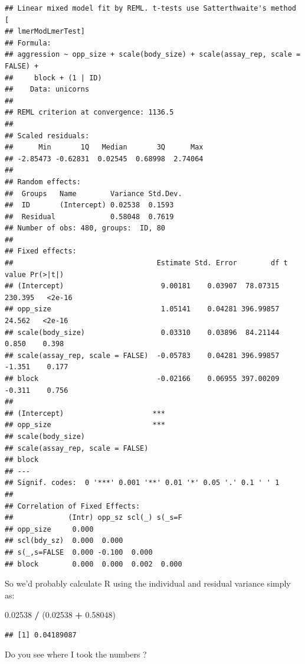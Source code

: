 \documentclass[
  12pt,
]{book}
\makeatletter
\newenvironment{Shaded}{\begin{snugshade}}{\end{snugshade}}
\newcommand{\FloatTok}[1]{\textcolor[rgb]{0.00,0.00,0.81}{#1}}
\newcommand{\NormalTok}[1]{#1}
\newcommand{\OperatorTok}[1]{\textcolor[rgb]{0.81,0.36,0.00}{\textbf{#1}}}
\newcommand{\StringTok}[1]{\textcolor[rgb]{0.31,0.60,0.02}{#1}}
\newenvironment{kframe}{%
\medskip{}
\setlength{\fboxsep}{.8em}
\def\at@end@of@kframe{}%
\ifinner\ifhmode%
 \def\at@end@of@kframe{\end{minipage}}%
 \begin{minipage}{\columnwidth}%
\fi\fi%
\def\FrameCommand##1{\hskip\@totalleftmargin \hskip-\fboxsep
\colorbox{incolor}{##1}\hskip-\fboxsep
    \hskip-\linewidth \hskip-\@totalleftmargin \hskip\columnwidth}%
\MakeFramed {\advance\hsize-\width
  \@totalleftmargin\z@ \linewidth\hsize
  \@setminipage}}%
{\par\unskip\endMakeFramed%
\at@end@of@kframe}
\newenvironment{rmdblock}[1]
 {
 \begin{itemize}
 \renewcommand{\labelitemi}{
   \raisebox{-.7\height}[0pt][0pt]{
     {\setkeys{Gin}{width=3em,keepaspectratio}\texttt{[image: images/icons/\#1]}}
   }
 }
 \begin{kframe}
 \setlength{\fboxsep}{1em}
 \item
 }
 {
 \end{kframe}
 \end{itemize}
 }
\newenvironment{rmdcode}
  {\begin{rmdblock}{code}}
  {\end{rmdblock}}
\makeatother
\begin{document}
\begin{verbatim}
## Linear mixed model fit by REML. t-tests use Satterthwaite's method [
## lmerModLmerTest]
## Formula: 
## aggression ~ opp_size + scale(body_size) + scale(assay_rep, scale = FALSE) +  
##     block + (1 | ID)
##    Data: unicorns
## 
## REML criterion at convergence: 1136.5
## 
## Scaled residuals: 
##      Min       1Q   Median       3Q      Max 
## -2.85473 -0.62831  0.02545  0.68998  2.74064 
## 
## Random effects:
##  Groups   Name        Variance Std.Dev.
##  ID       (Intercept) 0.02538  0.1593  
##  Residual             0.58048  0.7619  
## Number of obs: 480, groups:  ID, 80
## 
## Fixed effects:
##                                  Estimate Std. Error        df t value Pr(>|t|)
## (Intercept)                       9.00181    0.03907  78.07315 230.395   <2e-16
## opp_size                          1.05141    0.04281 396.99857  24.562   <2e-16
## scale(body_size)                  0.03310    0.03896  84.21144   0.850    0.398
## scale(assay_rep, scale = FALSE)  -0.05783    0.04281 396.99857  -1.351    0.177
## block                            -0.02166    0.06955 397.00209  -0.311    0.756
##                                    
## (Intercept)                     ***
## opp_size                        ***
## scale(body_size)                   
## scale(assay_rep, scale = FALSE)    
## block                              
## ---
## Signif. codes:  0 '***' 0.001 '**' 0.01 '*' 0.05 '.' 0.1 ' ' 1
## 
## Correlation of Fixed Effects:
##             (Intr) opp_sz scl(_) s(_s=F
## opp_size     0.000                     
## scl(bdy_sz)  0.000  0.000              
## s(_,s=FALSE  0.000 -0.100  0.000       
## block        0.000  0.000  0.002  0.000
\end{verbatim}

So we'd probably calculate R using the individual and residual variance simply as:

\begin{Shaded}
\begin{Highlighting}[]
\FloatTok{0.02538} \OperatorTok{/}\StringTok{ }\NormalTok{(}\FloatTok{0.02538} \OperatorTok{+}\StringTok{ }\FloatTok{0.58048}\NormalTok{)}
\end{Highlighting}
\end{Shaded}

\begin{verbatim}
## [1] 0.04189087
\end{verbatim}

\begin{rmdcode}
Do you see where I took the numbers ?
\end{rmdcode}
\end{document}
